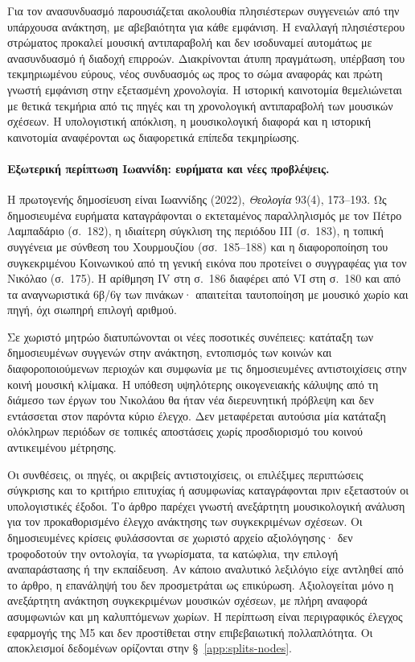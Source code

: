 \documentclass[11pt,a4paper]{article}
\begin{document}
Για τον ανασυνδυασμό παρουσιάζεται ακολουθία πλησιέστερων συγγενειών από την υπάρχουσα ανάκτηση, με αβεβαιότητα για κάθε εμφάνιση. Η εναλλαγή πλησιέστερου στρώματος προκαλεί μουσική αντιπαραβολή και δεν ισοδυναμεί αυτομάτως με ανασυνδυασμό ή διαδοχή επιρροών. Διακρίνονται άτυπη πραγμάτωση, υπέρβαση του τεκμηριωμένου εύρους, νέος συνδυασμός ως προς το σώμα αναφοράς και πρώτη γνωστή εμφάνιση στην εξετασμένη χρονολογία. Η ιστορική καινοτομία θεμελιώνεται με θετικά τεκμήρια από τις πηγές και τη χρονολογική αντιπαραβολή των μουσικών σχέσεων. Η υπολογιστική απόκλιση, η μουσικολογική διαφορά και η ιστορική καινοτομία αναφέρονται ως διαφορετικά επίπεδα τεκμηρίωσης.

\paragraph{Εξωτερική περίπτωση Ιωαννίδη: ευρήματα και νέες προβλέψεις.}
Η πρωτογενής δημοσίευση είναι Ιωαννίδης (2022), \emph{Θεολογία} 93(4), 173--193. Ως δημοσιευμένα ευρήματα καταγράφονται ο εκτεταμένος παραλληλισμός με τον Πέτρο Λαμπαδάριο (σ.~182), η ιδιαίτερη σύγκλιση της περιόδου III (σ.~183), η τοπική συγγένεια με σύνθεση του Χουρμουζίου (σσ.~185--188) και η διαφοροποίηση του συγκεκριμένου Κοινωνικού από τη γενική εικόνα που προτείνει ο συγγραφέας για τον Νικόλαο (σ.~175). Η αρίθμηση IV στη σ.~186 διαφέρει από VI στη σ.~180 και από τα αναγνωριστικά 6β/6γ των πινάκων· απαιτείται ταυτοποίηση με μουσικό χωρίο και πηγή, όχι σιωπηρή επιλογή αριθμού.

Σε χωριστό μητρώο διατυπώνονται οι νέες ποσοτικές συνέπειες: κατάταξη των δημοσιευμένων συγγενών στην ανάκτηση, εντοπισμός των κοινών και διαφοροποιούμενων περιοχών και συμφωνία με τις δημοσιευμένες αντιστοιχίσεις στην κοινή μουσική κλίμακα. Η υπόθεση υψηλότερης οικογενειακής κάλυψης από τη διάμεσο των έργων του Νικολάου θα ήταν νέα διερευνητική πρόβλεψη και δεν εντάσσεται στον παρόντα κύριο έλεγχο. Δεν μεταφέρεται αυτούσια μία κατάταξη ολόκληρων περιόδων σε τοπικές αποστάσεις χωρίς προσδιορισμό του κοινού αντικειμένου μέτρησης.

Οι συνθέσεις, οι πηγές, οι ακριβείς αντιστοιχίσεις, οι επιλέξιμες περιπτώσεις σύγκρισης και το κριτήριο επιτυχίας ή ασυμφωνίας καταγράφονται πριν εξεταστούν οι υπολογιστικές έξοδοι. Το άρθρο παρέχει γνωστή ανεξάρτητη μουσικολογική ανάλυση για τον προκαθορισμένο έλεγχο ανάκτησης των συγκεκριμένων σχέσεων. Οι δημοσιευμένες κρίσεις φυλάσσονται σε χωριστό αρχείο αξιολόγησης· δεν τροφοδοτούν την οντολογία, τα γνωρίσματα, τα κατώφλια, την επιλογή αναπαράστασης ή την εκπαίδευση. Αν κάποιο αναλυτικό λεξιλόγιο είχε αντληθεί από το άρθρο, η επανάληψή του δεν προσμετράται ως επικύρωση. Αξιολογείται μόνο η ανεξάρτητη ανάκτηση συγκεκριμένων μουσικών σχέσεων, με πλήρη αναφορά ασυμφωνιών και μη καλυπτόμενων χωρίων. Η περίπτωση είναι περιγραφικός έλεγχος εφαρμογής της M5 και δεν προστίθεται στην επιβεβαιωτική πολλαπλότητα. Οι αποκλεισμοί δεδομένων ορίζονται στην §~\ref{app:splits-nodes}.
\end{document}
